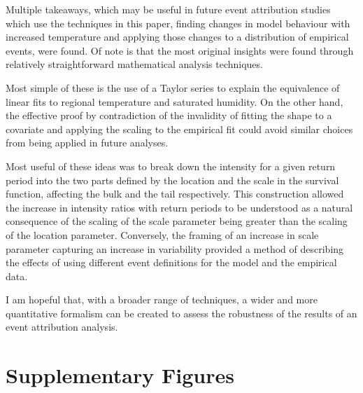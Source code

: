 \documentclass[12pt,a4paper,openany]{report}
\begin{document}
Multiple takeaways,
    which may be useful in future event attribution studies
    which use the techniques in this paper,
    finding changes in model behaviour with increased temperature
    and applying those changes to a distribution of empirical events,
    were found.
Of note is that the most original insights were found through relatively straightforward mathematical analysis techniques.

Most simple of these is the use of a Taylor series to explain
    the equivalence of linear fits to regional temperature and saturated humidity.
On the other hand,
    the effective proof by contradiction of the invalidity of fitting the shape to a covariate and applying the
    scaling to the empirical fit could avoid similar choices from being applied in future analyses.

Most useful of these ideas was to break down the intensity for a given return period
    into the two parts defined by the location and the scale in the survival function,
    affecting the bulk and the tail respectively.
This construction allowed the increase in intensity ratios with return periods to be understood as
    a natural consequence of the scaling of the scale parameter being greater than the
    scaling of the location parameter.
Conversely,
    the framing of an increase in scale parameter capturing an increase in variability
    provided a method of describing the effects of using different event definitions for the model and the empirical data.

I am hopeful that,
    with a broader range of techniques,
    a wider and more quantitative formalism can be created to assess the robustness
    of the results of an event attribution analysis.

\appendix


\chapter{Supplementary Figures}\label{ch:supp}
\end{document}
